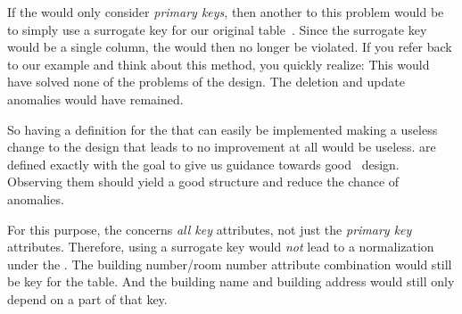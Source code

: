 If the  would only consider \emph{primary keys}, then another  to this problem would be to simply use a surrogate key for our original table~.
Since the surrogate key would be a single column, the  would then no longer be violated.
If you refer back to our example and think about this method, you quickly realize:
This would have solved none of the problems of the design.
The deletion and update anomalies would have remained.

So having a definition for the  that can easily be implemented making a useless change to the design that leads to no improvement at all would be useless.
 are defined exactly with the goal to give us guidance towards good \db\ design.
Observing them should yield a good structure and reduce the chance of anomalies.

For this purpose, the  concerns \emph{all key} attributes, not just the \emph{primary key} attributes.
Therefore, using a surrogate key would \emph{not} lead to a normalization under the .
The building number/room number attribute combination would still be key for the table.
And the building name and building address would still only depend on a part of that key.%
\endhsection%
